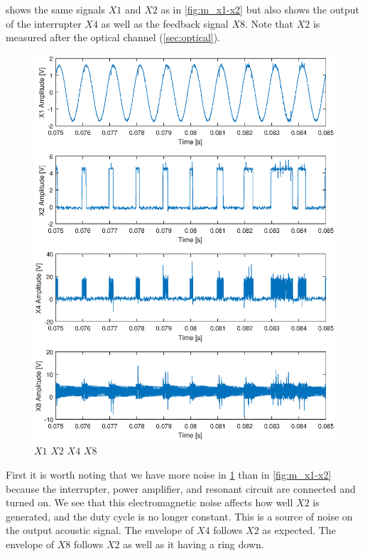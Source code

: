  shows the same signals $X1$ and $X2$ as in \cref{fig:m_x1-x2} but also shows the output of the interrupter $X4$ as well as the feedback signal $X8$. Note that $X2$ is measured after the optical channel (\cref{sec:optical}).

\begin{figure}[H]
    \centering
    \includegraphics[trim={1cm 0cm 1cm 0cm},clip,width=\textwidth]{img/X1-X2-X4-X8.eps}
    \caption{$X1$ $X2$ $X4$ $X8$}
    \label{fig:m_x1-x2-x4-x8}
\end{figure}

First it is worth noting that we have more noise in \cref{fig:m_x1-x2-x4-x8} than in \cref{fig:m_x1-x2} because the interrupter, power amplifier, and resonant circuit are connected and turned on. We see that this electromagnetic noise affects how well $X2$ is generated, and the duty cycle is no longer constant. This is a source of noise on the output acoustic signal. The envelope of $X4$ follows $X2$ as expected. The envelope of $X8$ follows $X2$ as well as it having a ring down.

